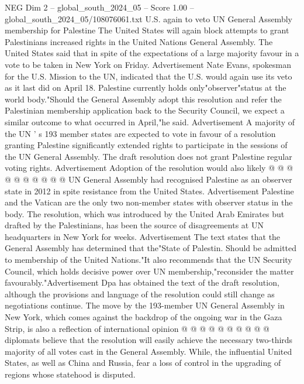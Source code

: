 \begin{textsample}{NEG Dim 2 – global\_south\_2024\_05 – Score 1.00 – global\_south\_2024\_05/108076061.txt}  \label{ex:f2_neg_220}
U.S. again to veto UN General Assembly membership for Palestine The United States will again block attempts to grant Palestinians increased rights in the United Nations General Assembly.
The United States said that in spite of the expectations of a large majority favour in a vote to be taken in New York on Friday.
Advertisement Nate Evans, spokesman for the U.S.
Mission to the UN, indicated that the U.S. would again use its veto as it last did on April 18.
Palestine currently holds only"observer"status at the world body."Should the General Assembly adopt this resolution and refer the Palestinian membership application back to the Security Council, we expect a similar outcome to what occurred in April,"he said.
Advertisement A majority of the UN ' s 193 member states are expected to vote in favour of a resolution granting Palestine significantly extended rights to participate in the sessions of the UN General Assembly.
The draft resolution does not grant Palestine regular voting rights.
Advertisement Adoption of the resolution would also likely @ @ @ @ @ @ @ @ @ @ UN General Assembly had recognised Palestine as an observer state in 2012 in spite resistance from the United States.
Advertisement Palestine and the Vatican are the only two non-member states with observer status in the body.
The resolution, which was introduced by the United Arab Emirates but drafted by the Palestinians, has been the source of disagreements at UN headquarters in New York for weeks.
Advertisement The text states that the General Assembly has determined that the"State of Palestin.
Should be admitted to membership of the United Nations."It also recommends that the UN Security Council, which holds decisive power over UN membership,"reconsider the matter favourably."Advertisement Dpa has obtained the text of the draft resolution, although the provisions and language of the resolution could still change as negotiations continue.
The move by the 193-member UN General Assembly in New York, which comes against the backdrop of the ongoing war in the Gaza Strip, is also a reflection of international opinion @ @ @ @ @ @ @ @ @ @ diplomats believe that the resolution will easily achieve the necessary two-thirds majority of all votes cast in the General Assembly.
While, the influential United States, as well as China and Russia, fear a loss of control in the upgrading of regions whose statehood is disputed.

\end{textsample}
